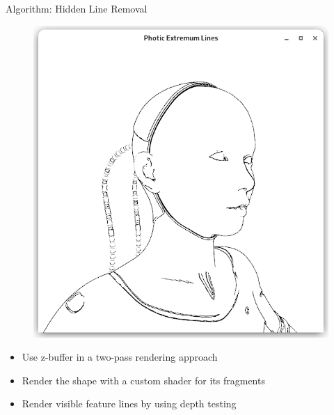 \documentclass[aspectratio=169]{beamer}
\begin{document}
\begin{frame}{Algorithm: Hidden Line Removal}
\begin{figure}
      \includegraphics[height=0.49\textheight,trim={15px 15 15 50},clip]{images/cyborg-contour-pel-shader.png}
    \end{figure}
    \bigskip
    \pause
    \begin{itemize}
      \item<+-> Use z-buffer in a two-pass rendering approach
      \item<+-> Render the shape with a custom shader for its fragments
      \item<+-> Render visible feature lines by using depth testing
    \end{itemize}
  \end{frame}
\end{document}
